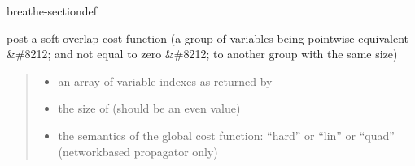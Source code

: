 \documentclass[letterpaper,10pt,openany,oneside,english]{sphinxmanual}
\begin{document}
\begin{fulllineitems}
\begin{sphinxuseclass}{breathe-sectiondef}
\begin{fulllineitems}
\end{fulllineitems}


\begin{fulllineitems}
\label{\detokenize{ref/ref_cpp:_CPPv4N11WeightedCSP12postWOverlapEPii6string4Cost6stringi}}\label{\detokenize{ref/ref_cpp:_CPPv3N11WeightedCSP12postWOverlapEPii6string4Cost6stringi}}\label{\detokenize{ref/ref_cpp:_CPPv2N11WeightedCSP12postWOverlapEPii6string4Cost6stringi}}\label{\detokenize{ref/ref_cpp:WeightedCSP::postWOverlap__iP.i.string.Cost.string.i}}
\pysigstartsignatures
\pysigstartmultiline
{}
\pysigstopmultiline
\pysigstopsignatures
\sphinxAtStartPar
post a soft overlap cost function (a group of variables being point\sphinxhyphen{}wise equivalent \&\#8212; and not equal to zero \&\#8212; to another group with the same size) 
\begin{quote}\begin{description}
\begin{itemize}
\item {} 
\sphinxAtStartPar
{} \textendash{} an array of variable indexes as returned by {\hyperref[\detokenize{ref/ref_cpp:classWeightedCSP_1a2329c94c60817153e45de627c79f8281}]{}} 

\item {} 
\sphinxAtStartPar
{} \textendash{} the size of  (should be an even value) 

\item {} 
\sphinxAtStartPar
{} \textendash{} the semantics of the global cost function: “hard” or “lin” or “quad” (network\sphinxhyphen{}based propagator only) 


\end{itemize}
\end{description}
\end{quote}
\end{fulllineitems}
\end{sphinxuseclass}
\end{fulllineitems}
\end{document}
